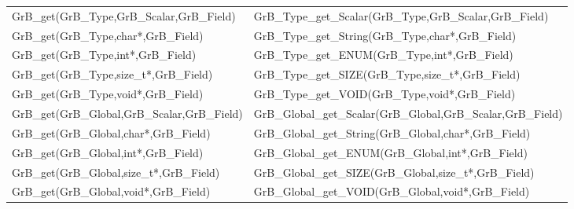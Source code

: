 \begin{table}[htb]
{\begin{tabular}{l|l}
{\sf GrB\_get(GrB\_Type,GrB\_Scalar,GrB\_Field)}  & {\sf GrB\_Type\_get\_Scalar(GrB\_Type,GrB\_Scalar,GrB\_Field)} \\
{\sf GrB\_get(GrB\_Type,char*,GrB\_Field)}        & {\sf GrB\_Type\_get\_String(GrB\_Type,char*,GrB\_Field)}       \\
{\sf GrB\_get(GrB\_Type,int*,GrB\_Field)}           & {\sf GrB\_Type\_get\_ENUM(GrB\_Type,int*,GrB\_Field)}        \\
{\sf GrB\_get(GrB\_Type,size\_t*,GrB\_Field)}       & {\sf GrB\_Type\_get\_SIZE(GrB\_Type,size\_t*,GrB\_Field)}    \\
{\sf GrB\_get(GrB\_Type,void*,GrB\_Field)}          & {\sf GrB\_Type\_get\_VOID(GrB\_Type,void*,GrB\_Field)}       \\
\hline

{\sf GrB\_get(GrB\_Global,GrB\_Scalar,GrB\_Field)}  & {\sf GrB\_Global\_get\_Scalar(GrB\_Global,GrB\_Scalar,GrB\_Field)} \\
{\sf GrB\_get(GrB\_Global,char*,GrB\_Field)}        & {\sf GrB\_Global\_get\_String(GrB\_Global,char*,GrB\_Field)}       \\
{\sf GrB\_get(GrB\_Global,int*,GrB\_Field)}           & {\sf GrB\_Global\_get\_ENUM(GrB\_Global,int*,GrB\_Field)}        \\
{\sf GrB\_get(GrB\_Global,size\_t*,GrB\_Field)}       & {\sf GrB\_Global\_get\_SIZE(GrB\_Global,size\_t*,GrB\_Field)}    \\
{\sf GrB\_get(GrB\_Global,void*,GrB\_Field)}          & {\sf GrB\_Global\_get\_VOID(GrB\_Global,void*,GrB\_Field)}       \\
\hline

\end{tabular}
}
\label{Tab:NonPolymorphic7}
\end{table}



